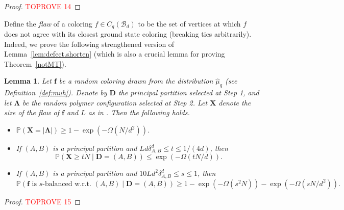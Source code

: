 \documentclass{amsart}
\newtheorem{lem}[thm]{Lemma}
\theoremstyle{definition}
\newcommand{\cB}{\mathcal{B} }
\newcommand{\0}[0]{\emptyset}
\newcommand{\pr}[0]{\mathbb{P}}
\begin{document}
\begin{proof}\textcolor{red}{TOPROVE 14}\end{proof}





Define the \textit{flaw} of a coloring $f \in C_q(\cB_d)$ to be the set of vertices at which $f$ does not agree with its closest ground state coloring (breaking ties arbitrarily). 
Indeed, we prove the following strengthened version of Lemma~\ref{lem:defect.shorten} (which is also a crucial lemma for proving Theorem~\ref{notMT}).


\begin{lem}\label{lem:defect}
Let $\mathbf f$ be a random coloring drawn from the distribution $\hat{\mu}_q$ (see Definition~\ref{def:muh}). Denote by $\mathbf D$ the principal partition selected at Step 1, and let $\mathbf \Lambda$ be the random polymer configuration selected at Step 2. Let $\mathbf X$ denote the size of the flaw of $\mathbf f$ and $L$ as in .
Then the following holds.
\begin{itemize}
\item[(i)] $\pr(\mathbf X = |\mathbf\Lambda|) \geq 1 - \exp\left(-\Omega\left(N/d^2\right)\right)$.

\item[(ii)] If $(A, B)$ is a principal partition and $Ld\delta^d_{A, B} \leq t \leq 1/(4d)$, then
\[
\pr(\mathbf X \geq tN \mid \mathbf D=(A, B)) \leq \exp\left(-\Omega\left(tN/d\right)\right).
\]

\item[(iii)] If $(A, B)$ is a principal partition and $10Ld^2\delta_{A, B}^d \leq s\leq 1$, then
\[
\pr\left(\text{$\mathbf f$ is $s$-balanced w.r.t. $(A, B)$} \mid \mathbf D=(A, B) \right) \geq 1 - \exp\left(-\Omega\left(s^2N\right)\right) - \exp\left(-\Omega\left(sN/d^2\right)\right).
\]

\end{itemize}
\end{lem}



\begin{proof}\textcolor{red}{TOPROVE 15}\end{proof}
\end{document}
